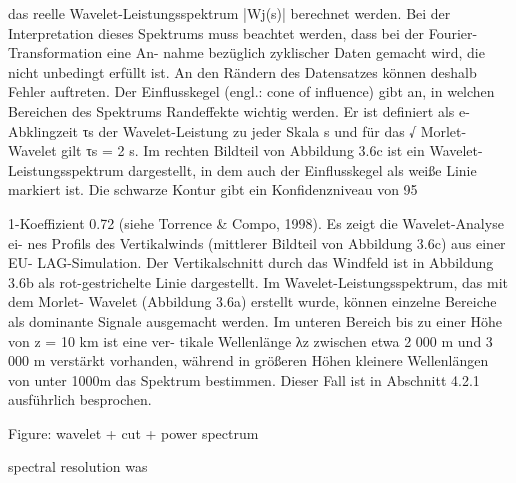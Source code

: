 das reelle Wavelet-Leistungsspektrum |Wj(s)| berechnet werden. Bei der Interpretation
dieses Spektrums muss beachtet werden, dass bei der Fourier-Transformation eine An-
nahme bezüglich zyklischer Daten gemacht wird, die nicht unbedingt erfüllt ist. An den
Rändern des Datensatzes können deshalb Fehler auftreten. Der Einflusskegel (engl.: cone
of influence) gibt an, in welchen Bereichen des Spektrums Randeffekte wichtig werden.
Er ist definiert als e-Abklingzeit τs der Wavelet-Leistung zu jeder Skala s und für das √
Morlet-Wavelet gilt τs = 2 s.
Im rechten Bildteil von Abbildung 3.6c ist ein Wavelet-Leistungsspektrum dargestellt, in dem auch der Einflusskegel als weiße Linie markiert ist. Die schwarze Kontur gibt ein Konfidenzniveau von 95 %

1-Koeffizient 0.72 (siehe Torrence & Compo, 1998). Es zeigt die Wavelet-Analyse ei- nes Profils des Vertikalwinds (mittlerer Bildteil von Abbildung 3.6c) aus einer EU- LAG-Simulation. Der Vertikalschnitt durch das Windfeld ist in Abbildung 3.6b als rot-gestrichelte Linie dargestellt. Im Wavelet-Leistungsspektrum, das mit dem Morlet- Wavelet (Abbildung 3.6a) erstellt wurde, können einzelne Bereiche als dominante Signale ausgemacht werden. Im unteren Bereich bis zu einer Höhe von z = 10 km ist eine ver- tikale Wellenlänge λz zwischen etwa 2 000 m und 3 000 m verstärkt vorhanden, während in größeren Höhen kleinere Wellenlängen von unter 1000m das Spektrum bestimmen. Dieser Fall ist in Abschnitt 4.2.1 ausführlich besprochen.



Figure: wavelet + cut + power spectrum 

spectral resolution was \cite{torrence_practical_1998}